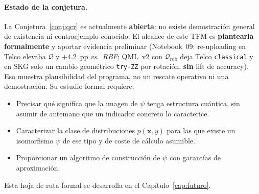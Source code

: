 \paragraph{Estado de la conjetura.}
La Conjetura~\ref{conj:qcr} es actualmente \textbf{abierta}: no existe demostración general de existencia ni contraejemplo conocido. El alcance de este TFM es \textbf{plantearla formalmente} y aportar evidencia preliminar (Notebook~09: re-uploading en Telco elevaba $\mathcal{Q}$ y $+4.2$~pp \emph{vs.\ RBF}; QML~v2 con $\mathcal{Q}_{\mathrm{rob}}$ deja Telco \texttt{classical} y en SKG solo un cambio geométrico \texttt{try-ZZ} por rotación, \textbf{sin} lift de accuracy). Eso muestra plausibilidad del programa, no un rescate operativo ni una demostración. Su estudio formal requiere:
\begin{itemize}
  \item Precisar qué significa que la imagen de $\psi$ tenga estructura cuántica, sin asumir de antemano que un indicador concreto lo caracterice.
  \item Caracterizar la clase de distribuciones $p(\mathbf{x}, y)$ para las que existe un isomorfismo $\psi$ de ese tipo y de coste de cálculo asumible.
  \item Proporcionar un algoritmo de construcción de $\psi$ con garantías de aproximación.
\end{itemize}
Esta hoja de ruta formal se desarrolla en el Capítulo~\ref{cap:futuro}.

